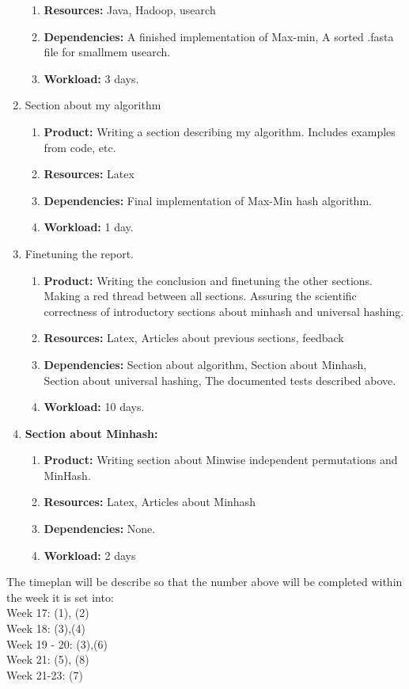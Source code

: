 \documentclass[../../main.tex]{subfiles}
\begin{document}
\begin{enumerate}
\begin{enumerate}
\item {\bf Resources:} Java, Hadoop, usearch
\item {\bf Dependencies:} A finished implementation of Max-min, A sorted .fasta file for smallmem usearch.
\item {\bf Workload:} 3 days.
\end{enumerate}
\item Section about my algorithm
\begin{enumerate}
\item {\bf Product:} Writing a section describing my algorithm. Includes examples from code, etc.
\item {\bf Resources:} Latex
\item {\bf Dependencies:} Final implementation of Max-Min hash algorithm.
\item {\bf Workload:} 1 day.
\end{enumerate}
\item Finetuning the report.
\begin{enumerate}
\item {\bf Product:} Writing the conclusion and finetuning the other sections. Making a red thread between all sections. Assuring the scientific correctness of introductory sections about minhash and universal hashing.
\item {\bf Resources:} Latex, Articles about previous sections, feedback
\item {\bf Dependencies:}  Section about algorithm, Section about Minhash, Section about universal hashing, The documented tests described above. 
\item {\bf Workload:} 10 days.
\end{enumerate}
\item {\bf Section about Minhash:}
\begin{enumerate}
\item {\bf Product:} Writing section about Minwise independent permutations and MinHash.
\item {\bf Resources:} Latex, Articles about Minhash
\item {\bf Dependencies:} None.
\item {\bf Workload:} 2 days
\end{enumerate}
\end{enumerate}

The timeplan will be describe so that the number above will be completed within the week it is set into:\\

\noindent Week 17: (1), (2)\\
Week 18: (3),(4)\\
Week 19 - 20: (3),(6)\\
Week 21: (5), (8)\\
Week 21-23: (7)


 
 
\end{document}
